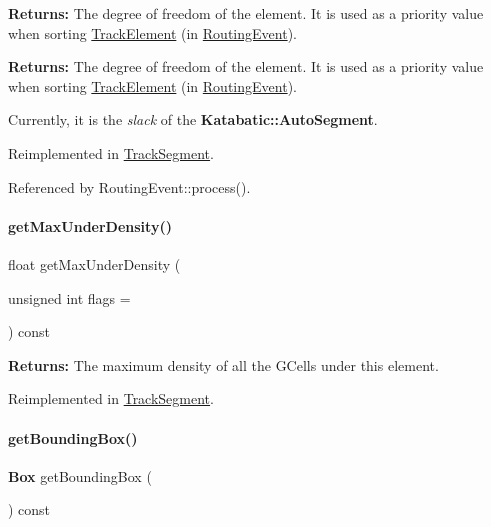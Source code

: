 {\bfseries Returns\+:} The degree of freedom of the element. It is used as a priority value when sorting \mbox{\hyperlink{classKite_1_1TrackElement}{Track\+Element}} (in \mbox{\hyperlink{classKite_1_1RoutingEvent}{Routing\+Event}}).

{\bfseries Returns\+:} The degree of freedom of the element. It is used as a priority value when sorting \mbox{\hyperlink{classKite_1_1TrackElement}{Track\+Element}} (in \mbox{\hyperlink{classKite_1_1RoutingEvent}{Routing\+Event}}).

Currently, it is the {\itshape slack} of the \textbf{ Katabatic\+::\+Auto\+Segment}. 

Reimplemented in \mbox{\hyperlink{classKite_1_1TrackSegment_aa7552c20cc46abcac558627b2ca341f8}{Track\+Segment}}.



Referenced by Routing\+Event\+::process().

\mbox{\label{classKite_1_1TrackElement_aa34ceb4288e76357b65725ca00e56df8}} 
\paragraph{\texorpdfstring{get\+Max\+Under\+Density()}{getMaxUnderDensity()}}
{\footnotesize\ttfamily float get\+Max\+Under\+Density (\begin{DoxyParamCaption}\item[{unsigned int}]{flags = {} }\end{DoxyParamCaption}) const\hspace{0.3cm}{\ttfamily [virtual]}}

{\bfseries Returns\+:} The maximum density of all the G\+Cells under this element. 

Reimplemented in \mbox{\hyperlink{classKite_1_1TrackSegment_abb61228ad7b29c19c6428902d34126f7}{Track\+Segment}}.

\mbox{\label{classKite_1_1TrackElement_ab5d8bf98ab5af6fcfebea1b9f446d5d7}} 
\paragraph{\texorpdfstring{get\+Bounding\+Box()}{getBoundingBox()}}
{\footnotesize\ttfamily \textbf{ Box} get\+Bounding\+Box (\begin{DoxyParamCaption}{ }\end{DoxyParamCaption}) const\hspace{0.3cm}{\ttfamily [inline]}}

